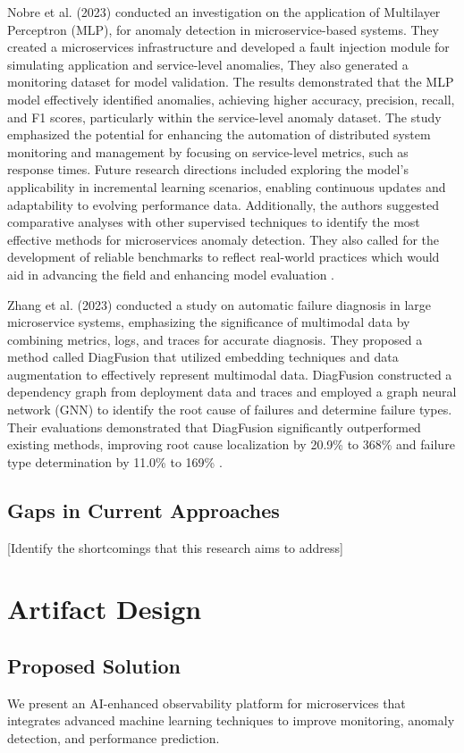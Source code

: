 \documentclass[10pt,journal,compsoc]{IEEEtran}
\begin{document}
Nobre et al. (2023) conducted an investigation on the application of Multilayer Perceptron (MLP), for anomaly detection in microservice-based systems. They created a microservices infrastructure and developed a fault injection module for simulating application and service-level anomalies, They also generated  a monitoring dataset for model validation. The results demonstrated that the MLP model effectively identified anomalies, achieving higher accuracy, precision, recall, and F1 scores, particularly within the service-level anomaly dataset. The study emphasized the potential for enhancing the automation of distributed system monitoring and management by focusing on service-level metrics, such as response times. Future research directions included exploring the model's applicability in incremental learning scenarios, enabling continuous updates and adaptability to evolving performance data. Additionally, the authors suggested comparative analyses with other supervised techniques to identify the most effective methods for microservices anomaly detection. They also called for the development of reliable benchmarks to reflect real-world practices which would aid in advancing the field and enhancing model evaluation \cite{nobre2023anomaly}.

Zhang et al. (2023) conducted a study on automatic failure diagnosis in large microservice systems, emphasizing the significance of multimodal data by combining metrics, logs, and traces for accurate diagnosis. They proposed a method called DiagFusion that utilized embedding techniques and data augmentation to effectively represent multimodal data. DiagFusion constructed a dependency graph from deployment data and traces and employed a graph neural network (GNN) to identify the root cause of failures and determine failure types. Their evaluations demonstrated that DiagFusion significantly outperformed existing methods, improving root cause localization by 20.9\% to 368\% and failure type determination by 11.0\% to 169\% \cite{zhang2023robust}.

\subsection{Gaps in Current Approaches}
[Identify the shortcomings that this research aims to address]

\section{Artifact Design}
\subsection{Proposed Solution}
We present an AI-enhanced observability platform for microservices that integrates advanced machine learning techniques to improve monitoring, anomaly detection, and performance prediction.
\end{document}

